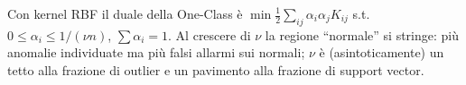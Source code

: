 \documentclass[11pt,a4paper]{article}
\newcounter{cap}
\newcounter{sol}[cap]
\begin{document}
\begin{soluzione}
Con kernel RBF il duale della One-Class è
$\min \tfrac12\sum_{ij}\alpha_i\alpha_j K_{ij}$ s.t. $0 \le \alpha_i \le 1/(\nu n)$,
$\sum \alpha_i = 1$. Al crescere di $\nu$ la regione ``normale'' si stringe:
più anomalie individuate ma più falsi allarmi sui normali; $\nu$ è
(asintoticamente) un tetto alla frazione di outlier e un pavimento alla frazione di
support vector.
\end{soluzione}
\end{document}
